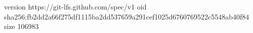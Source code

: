 version https://git-lfs.github.com/spec/v1
oid sha256:fb2dd2a66f275df1115ba2dd537659a291cef1025d6760769522c5548ab40f84
size 106983

